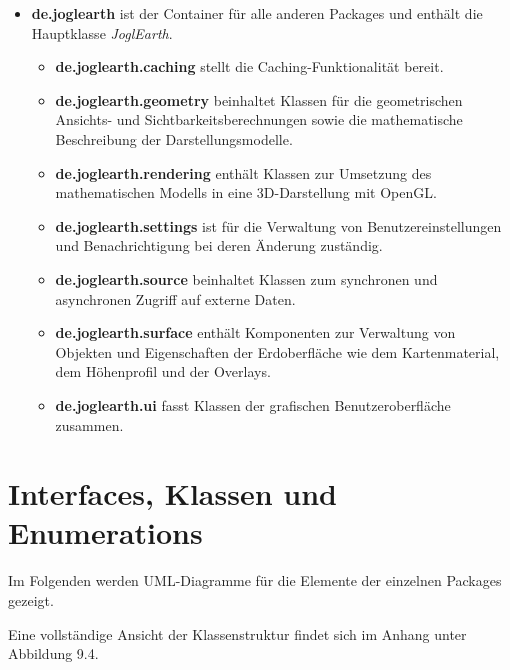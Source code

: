 \documentclass[10pt]{scrreprt}
\begin{document}
\begin{itemize}
\item \textbf{\sffamily de.joglearth} ist der Container für alle anderen Packages und enthält die Hauptklasse \textit{JoglEarth}.
\begin{itemize}
\item \textbf{\sffamily de.joglearth.caching} stellt die Caching-Funktionalität bereit.
\item \textbf{\sffamily de.joglearth.geometry} beinhaltet Klassen für die geometrischen Ansichts- und Sichtbarkeitsberechnungen sowie die mathematische Beschreibung der Darstellungsmodelle.
\item \textbf{\sffamily de.joglearth.rendering} enthält Klassen zur Umsetzung des mathematischen Modells in eine 3D-Darstellung mit OpenGL.
\item \textbf{\sffamily de.joglearth.settings} ist für die Verwaltung von Benutzereinstellungen und Benachrichtigung bei deren Änderung zuständig.
\item \textbf{\sffamily de.joglearth.source} beinhaltet Klassen zum synchronen und asynchronen Zugriff auf externe Daten.
\item \textbf{\sffamily de.joglearth.surface} enthält Komponenten zur Verwaltung von Objekten und Eigenschaften der Erdoberfläche wie dem Kartenmaterial, dem Höhenprofil und der Overlays.
\item \textbf{\sffamily de.joglearth.ui} fasst Klassen der grafischen Benutzeroberfläche zusammen.
\end{itemize}
\end{itemize}

\newpage

\section{Interfaces, Klassen und Enumerations}

Im Folgenden werden UML-Diagramme für die Elemente der einzelnen Packages gezeigt.

Eine vollständige Ansicht der Klassenstruktur findet sich im Anhang unter Abbildung 9.4.

\vspace{2mm}
\end{document}

